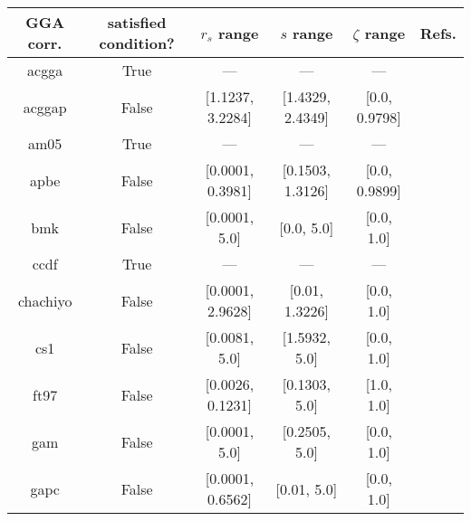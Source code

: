 \begin{tabular}{|c|c|c|c|c|l|}
\hline
     GGA corr. &  satisfied condition? &      $r_s$ range &        $s$ range &   $\zeta$ range  &                                                          Refs. \\ \hline
         acgga &                  True &              --- &              --- &              --- &                        \cite{Cancio2018_084116,Burke2014_4834} \\ \hline
        acggap &                 False & [1.1237, 3.2284] & [1.4329, 2.4349] &    [0.0, 0.9798] &                        \cite{Cancio2018_084116,Burke2014_4834} \\ \hline
          am05 &                  True &              --- &              --- &              --- &                 \cite{Armiento2005_085108,Mattsson2008_084714} \\ \hline
          apbe &                 False & [0.0001, 0.3981] & [0.1503, 1.3126] &    [0.0, 0.9899] &                                   \cite{Constantin2011_186406} \\ \hline
           bmk &                 False &    [0.0001, 5.0] &       [0.0, 5.0] &       [0.0, 1.0] &                                          \cite{Boese2004_3405} \\ \hline
          ccdf &                  True &              --- &              --- &              --- &                                      \cite{Margraf2019_244116} \\ \hline
      chachiyo &                 False & [0.0001, 2.9628] &   [0.01, 1.3226] &       [0.0, 1.0] &                                     \cite{Chachiyo2020_112669} \\ \hline
           cs1 &                 False &    [0.0081, 5.0] &    [1.5932, 5.0] &       [0.0, 1.0] &                          \cite{Handy2002_5411,Proynov2006_436} \\ \hline
          ft97 &                 False & [0.0026, 0.1231] &    [0.1303, 5.0] &       [1.0, 1.0] &                         \cite{Filatov1997_603,Filatov1997_847} \\ \hline
           gam &                 False &    [0.0001, 5.0] &    [0.2505, 5.0] &       [0.0, 1.0] &                                            \cite{Yu2015_12146} \\ \hline
          gapc &                 False & [0.0001, 0.6562] &      [0.01, 5.0] &       [0.0, 1.0] &                                        \cite{Fabiano2014_2016} \\ \hline

\end{tabular}
